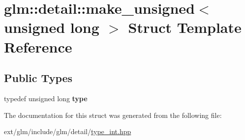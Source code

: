 \hypertarget{structglm_1_1detail_1_1make__unsigned_3_01unsigned_01long_01_4}{\section{glm\-:\-:detail\-:\-:make\-\_\-unsigned$<$ unsigned long $>$ Struct Template Reference}
\label{structglm_1_1detail_1_1make__unsigned_3_01unsigned_01long_01_4}
}
\subsection*{Public Types}
\begin{DoxyCompactItemize}
\item 
\hypertarget{structglm_1_1detail_1_1make__unsigned_3_01unsigned_01long_01_4_a8894ccd179135bda131b42cf10e58362}{typedef unsigned long {\bfseries type}}\label{structglm_1_1detail_1_1make__unsigned_3_01unsigned_01long_01_4_a8894ccd179135bda131b42cf10e58362}

\end{DoxyCompactItemize}


The documentation for this struct was generated from the following file\-:\begin{DoxyCompactItemize}
\item 
ext/glm/include/glm/detail/\hyperlink{type__int_8hpp}{type\-\_\-int.\-hpp}\end{DoxyCompactItemize}
